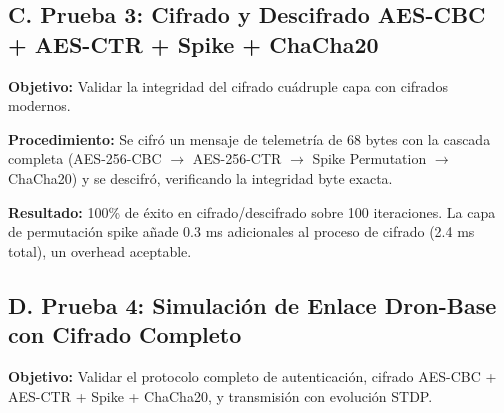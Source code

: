 \subsection*{C. Prueba 3: Cifrado y Descifrado AES-CBC + AES-CTR + Spike + ChaCha20}

\textbf{Objetivo:} Validar la integridad del cifrado cuádruple capa con cifrados modernos.

\textbf{Procedimiento:} Se cifró un mensaje de telemetría de 68 bytes con la cascada completa (AES-256-CBC $\to$ AES-256-CTR $\to$ Spike Permutation $\to$ ChaCha20) y se descifró, verificando la integridad byte exacta.

\begin{table}[H]
    \centering\footnotesize\setlength{\tabcolsep}{3pt}
    \caption{Parámetros de cifrado multicapa}
    \label{tab:enc-params-neuro}
\end{table}

\textbf{Resultado:} 100\% de éxito en cifrado/descifrado sobre 100 iteraciones. La capa de permutación spike añade 0.3 ms adicionales al proceso de cifrado (2.4 ms total), un overhead aceptable.

\subsection*{D. Prueba 4: Simulación de Enlace Dron-Base con Cifrado Completo}

\textbf{Objetivo:} Validar el protocolo completo de autenticación, cifrado AES-CBC + AES-CTR + Spike + ChaCha20, y transmisión con evolución STDP.

